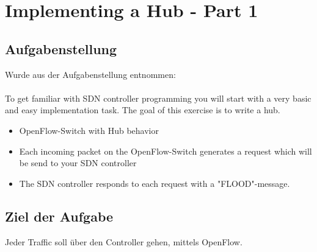 \documentclass[a4,12pt]{scrartcl}
\begin{document}
\section{Implementing a Hub - Part 1}

\subsection{Aufgabenstellung}
Wurde aus der Aufgabenstellung entnommen: \\
\\
To get familiar with SDN controller programming you will start with a very basic and easy implementation task. The goal of this exercise is to write a hub.
\begin{itemize}
\item OpenFlow-Switch with Hub behavior
\item Each incoming packet on the OpenFlow-Switch generates a request which will be send to your SDN controller
\item The SDN controller responds to each request with a "FLOOD"-message.
\end{itemize}

\subsection{Ziel der Aufgabe}
Jeder Traffic soll über den Controller gehen, mittels OpenFlow. 
\end{document}
